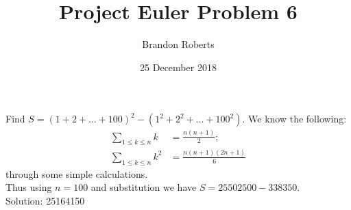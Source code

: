 \documentclass{article}
\begin{document}
\title{Project Euler Problem 6}
\author{Brandon Roberts}
\date{25 December 2018}

\maketitle

Find $S=(1+2+\dots+100)^{2}-(1^{2}+2^{2}+\dots+100^{2})$.
We know the following:
\begin{align*}
\sum_{1\leq k\leq n} k&= \frac{n(n+1)}{2};\\
\sum_{1\leq k\leq n} k^{2}&= \frac{n(n+1)(2n+1)}{6}
\end{align*}
through some simple calculations.\\
Thus using $n=100$ and substitution we have $S=25502500-338350$.\\
Solution: 25164150
\end{document}

